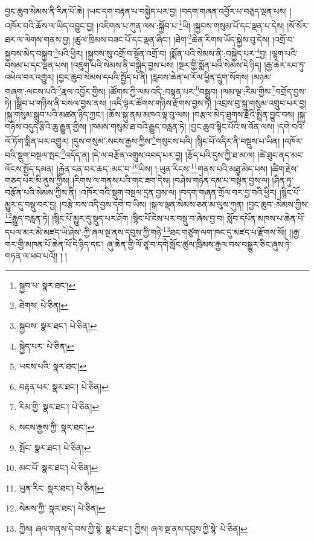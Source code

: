 བྱང་ཆུབ་སེམས་ནི་རིན་པོ་ཆེ། །ཡང་དག་བརྟན་པ་བསྐྱེད་པར་བྱ། །བདག་གཞན་འབྱོར་པ་བཅུད་ལྡན་པས། །འཁོར་བའི་ཆོས་ལ་ཡིད་འབྱུང་བྱ། །འཇིགས་པ་ཀུན་ལས་:སྐྱོབ་པ་\footnote{སྐྱབ་པ་  སྣར་ཐང་། }ཡི། །སྐྱབས་གསུམ་པོ་དང་ལྡན་པ་དེས། །སོ་སོར་ཐར་ལ་ལེགས་གནས་བྱ། །ཚུལ་ཁྲིམས་བཟང་པོ་དང་ལྡན་ཞིང་། །ཐེག་\footnote{ཐེགས་  པེ་ཅིན། }ཆེན་རིགས་ཡོད་སྐྱེས་བུ་དེས། །འགྲོ་བ་སྐྱབས་མེད་བསྐྱབ་\footnote{སྐྱབས་  སྣར་ཐང་།  པེ་ཅིན། }པའི་ཕྱིར། །སྐྱབས་སུ་འགྲོ་བ་སྔོན་འགྲོ་བ། །སྨོན་པའི་སེམས་ནི་:བསྐྱེད་པར་\footnote{སྐྱེད་པར་  པེ་ཅིན། }བྱ། །ལྷག་པའི་བསམ་པ་དང་ལྡན་པས། །འཇུག་པའི་སེམས་ནི་བསྐྱེད་བྱས་པས། །སྔར་གྱི་སྨོན་པའི་སེམས་དེ་ཉིད། །རྒྱ་ཆེར་རབ་ཏུ་འཕེལ་བར་འགྱུར། །བྱང་ཆུབ་སེམས་དཔའི་སྤྱོད་པ་ནི། །རླབས་ཆེན་ཕ་རོལ་ཕྱིན་དྲུག་སོགས། །མཉམ་གཞག་:ལངས་པའི་\footnote{ཡངས་པའི་  སྣར་ཐང་། }རྣལ་འབྱོར་གྱིས། །ཚོགས་ཀྱི་ལམ་འདི་:བསྟན་པར་\footnote{བརྟན་པར་  སྣར་ཐང་།  པེ་ཅིན། }བསྒྲུབ། །ལམ་ལྔ་:རིམ་གྱིས་\footnote{རིམ་གྱི་  སྣར་ཐང་།  པེ་ཅིན། }བགྲོད་བྱས་ཏེ། །སྒྲིབ་པ་གཉིས་ནི་བསལ་བྱས་ནས། །འདི་ལྟར་ཚོགས་གཉིས་རྫོགས་བྱས་ཏེ། །འབྲས་བུ་སྐུ་གསུམ་འགྲུབ་པར་བྱ། །སྐུ་གསུམ་སྒྲུབ་པའི་མཚན་ཉིད་ཀྱང་། །ཆོས་སྐུ་ནམ་མཁའ་ལྟ་བུ་ལས། །བརྩལ་མེད་ཐུགས་རྗེའི་སྤྲིན་བྱུང་བས། །སྐུ་གཉིས་བདུད་རྩིའི་ཆུ་རྒྱུན་གྱིས། །ཁམས་གསུམ་ཐ་བའི་རྒྱུད་བརླན་ཏེ། །བྱང་ཆུབ་སྙིང་པོའི་ས་བོན་ལས། །དགེ་བའི་ལོ་ཏོག་སྨིན་པར་འགྱུར། །དུས་གསུམ་:སངས་རྒྱས་ཀྱིས་\footnote{སངས་རྒྱས་ཀྱི་  སྣར་ཐང་། }གསུངས་པའི། །སྙིང་པོ་འདིར་ནི་བསྡུས་པ་ཡིན། །འཁོར་བའི་སྡུག་བསྔལ་སྤང་\footnote{སྤོང་  སྣར་ཐང་།  པེ་ཅིན། }འདོད་ན། །དེ་ལ་བརྩོན་འགྲུས་འབད་པར་བྱ། །རྩོད་པའི་དུས་ཀྱི་ཐ་མ་ལ། །ཚེ་ཐུང་ནད་མང་ལོངས་སྤྱོད་དམན། །རྐྱེན་ངན་བར་ཆད་:མང་བ་\footnote{མང་པོ་  སྣར་ཐང་།  པེ་ཅིན། }ཡིས། །:ཡུན་རིངས་\footnote{ཡུན་རིང་  སྣར་ཐང་།  པེ་ཅིན། }གནས་པའི་མཐུ་མེད་པས། །ཚིག་རྗེས་གཅད་པར་མི་ནུས་ཀྱིས། །རིགས་ལ་གནས་པའི་གང་ཟག་དེས། །བཤེས་གཉེན་དམ་པ་བསྟེན་བྱས་ལ། །ཤིན་ཏུ་བརྩོན་པའི་སེམས་ཀྱིས་ནི། །འཁོར་བའི་སྡུག་བསྔལ་དྲན་བྱས་ལ། །བདག་གཞན་གྲོལ་བར་བྱ་བའི་ཕྱིར། །སྙིང་པོ་མྱུར་དུ་བསྡུ་བར་བྱ། །བརྩེ་བས་འདི་བྱས་དགེ་བ་ཡིས། །སྐལ་ལྡན་སེམས་ཅན་མ་ལུས་ཀུན། །བྱང་ཆུབ་:སེམས་ཀྱིས་\footnote{སེམས་ཀྱི་  སྣར་ཐང་།  པེ་ཅིན། }རྒྱུད་བརླན་ཏེ། །སྙིང་པོ་མྱུར་དུ་སྡུད་པར་ཤོག །སྙིང་པོ་ངེས་པར་བསྡུ་བ་ཞེས་བྱ་བ། སློབ་དཔོན་མཁས་པ་ཆེན་པོ་དཔལ་མར་མེ་མཛད་ཡེ་ཤེས་:ཀྱི་ཞལ་སྔ་ནས་དབུས་ཀྱི་གཉེ་\footnote{ཀྱིས། ཞལ་གནས་དེ་བས་ཀྱི་སྙེ་  སྣར་ཐང་། ཀྱིས། ཞལ་སྔ་ནས་དབུས་ཀྱི་སྙེ་  པེ་ཅིན། }ཐང་གཙུག་ལག་ཁང་དུ་མཛད་པ་རྫོགས་སོ།། །།རྒྱ་གར་གྱི་མཁན་པོ་ཆེན་པོ་དེ་ཉིད་དང་། ཞུ་ཆེན་གྱི་ལོ་ཙཱ་བ་དགེ་སློང་ཚུལ་ཁྲིམས་རྒྱལ་བས་བསྒྱུར་ཅིང་ཞུས་ཏེ་གཏན་ལ་ཕབ་པའོ།། །
།